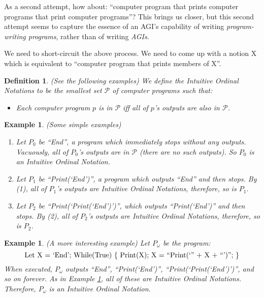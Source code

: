 \documentclass[runningheads]{llncs}
\newtheorem{myexample}[mytheorem]{Example}
\newtheorem{mydefinition}[mytheorem]{Definition}
\begin{document}
As a second attempt, how
about: ``computer program that prints computer programs that print
computer programs''? This brings us closer, but this second attempt
seems to capture the essence of an AGI's capability of writing \emph{program-writing programs},
rather than of writing \emph{AGIs}.

We need to short-circuit the above process. We need to come up with a notion
X which is equivalent to ``computer program that prints members of X''.

\begin{mydefinition}
\label{literalnotationdef}
    (See the following examples)
    We define the Intuitive Ordinal Notations to be the smallest set $\mathcal P$
    of computer programs such that:
    \begin{itemize}
        \item
            Each computer program $p$ is in $\mathcal P$ iff all of
            $p$'s outputs are also in $\mathcal P$.
    \end{itemize}
\end{mydefinition}

\begin{myexample}
\label{simpleexamples}
(Some simple examples)
    \begin{enumerate}
    \item
    Let $P_0$ be ``End'', a program which immediately stops without any outputs.
    Vacuously, all of $P_0$'s outputs are in $\mathcal P$
    (there are no such outputs). So $P_0$ is an Intuitive Ordinal Notation.
    \item
    Let $P_1$ be ``Print(`End')'', a program which outputs ``End'' and then
    stops. By (1), all of $P_1$'s outputs are Intuitive Ordinal Notations,
    therefore, so is $P_1$.
    \item
    Let $P_2$ be ``Print(`Print(`End')')'', which outputs ``Print(`End')'' and then
    stops. By (2), all of $P_2$'s outputs are Intuitive Ordinal Notations,
    therefore, so is $P_2$.
    \end{enumerate}
\end{myexample}

\begin{myexample}
\label{omegaexample}
(A more interesting example)
    Let $P_\omega$ be the program:
    \[
        \mbox{\normalfont Let X = `End';
        While(True) \{ Print(X); X = ``Print(`'' + X + ``')''; \}}
    \]
    When executed, $P_\omega$ outputs ``End'', ``Print(`End')'',
    ``Print(`Print(`End')')'', and so on forever. As
    in Example \ref{simpleexamples}, all of these are Intuitive Ordinal Notations.
    Therefore, $P_\omega$ is an Intuitive Ordinal Notation.
\end{myexample}
\end{document}
